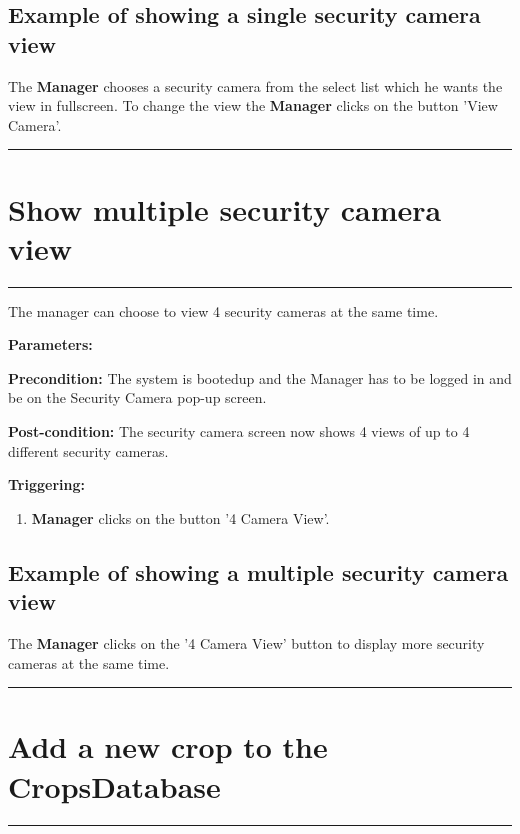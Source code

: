 \subsection{Example of showing a single security camera view}
The \textbf{Manager} chooses a security camera from the select list which he wants the view in fullscreen. To change the view  the \textbf{Manager} clicks on the button 'View Camera'.
\hfill
\vspace{0.5cm}
\hrule




\section{Show multiple security camera view}
\hrule
\hfill
\vspace{0.5cm}
\label{operation:Show multiple security camera view}

The manager can choose to view 4 security cameras at the same time.

\begin{description}

\item \textbf{Parameters:} 
\item \textbf{Precondition:} The system is bootedup and the Manager has to be
logged in and be on the Security Camera pop-up screen.
\item \textbf{Post-condition:} The security camera screen now shows 4 views of up to 4 different security cameras.
\item \textbf{Triggering:}
\begin{enumerate}

\item \textbf{Manager} clicks on the button '4 Camera View'.

\end{enumerate}
\end{description}

\subsection{Example of showing a multiple security camera view}
The \textbf{Manager} clicks on the '4 Camera View' button to display more security cameras at the same time.
\hfill
\vspace{0.5cm}
\hrule




\section{Add a new crop to the CropsDatabase}
\hrule
\hfill
\vspace{0.5cm}
\label{operation:Add a new crop the CropsDatabase}

